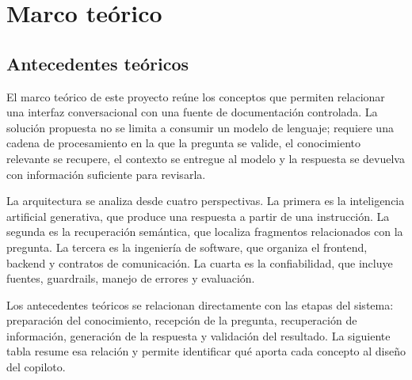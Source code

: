 \section{Marco teórico}

\subsection{Antecedentes teóricos}

El marco teórico de este proyecto reúne los conceptos que permiten relacionar una interfaz conversacional con una fuente de documentación controlada. La solución propuesta no se limita a consumir un modelo de lenguaje; requiere una cadena de procesamiento en la que la pregunta se valide, el conocimiento relevante se recupere, el contexto se entregue al modelo y la respuesta se devuelva con información suficiente para revisarla.

La arquitectura se analiza desde cuatro perspectivas. La primera es la inteligencia artificial generativa, que produce una respuesta a partir de una instrucción. La segunda es la recuperación semántica, que localiza fragmentos relacionados con la pregunta. La tercera es la ingeniería de software, que organiza el frontend, backend y contratos de comunicación. La cuarta es la confiabilidad, que incluye fuentes, guardrails, manejo de errores y evaluación.

Los antecedentes teóricos se relacionan directamente con las etapas del sistema: preparación del conocimiento, recepción de la pregunta, recuperación de información, generación de la respuesta y validación del resultado. La siguiente tabla resume esa relación y permite identificar qué aporta cada concepto al diseño del copiloto.

